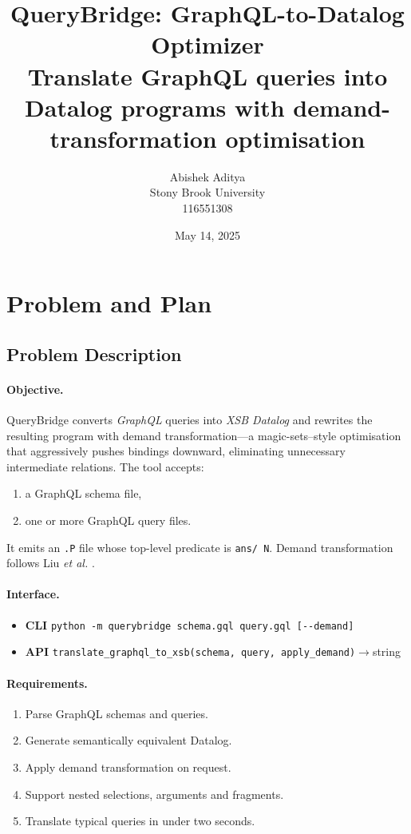 \documentclass[11pt]{article}
\title{\textbf{QueryBridge: GraphQL-to-Datalog Optimizer}\\
\large Translate GraphQL queries into Datalog programs with demand-transformation optimisation}
\author{Abishek Aditya \\ Stony Brook University \\ 116551308}
\date{May 14, 2025}
\begin{document}
\maketitle
\thispagestyle{fancy}

\section{Problem and Plan}
\subsection{Problem Description}
\paragraph{Objective.}
QueryBridge converts \emph{GraphQL} queries into \emph{XSB Datalog} and rewrites the resulting program with demand transformation—a magic-sets–style optimisation that aggressively pushes bindings downward, eliminating unnecessary intermediate relations.  
The tool accepts:
\begin{enumerate}[label=\arabic*.]
  \item a GraphQL schema file,
  \item one or more GraphQL query files.
\end{enumerate}
It emits an \texttt{.P} file whose top-level predicate is \texttt{ans/\,N}.  
Demand transformation follows Liu \emph{et al.} \cite{DemandTransform}.

\paragraph{Interface.}
\begin{itemize}[nosep,leftmargin=1.5em]
  \item \textbf{CLI} \verb|python -m querybridge schema.gql query.gql [--demand]|
  \item \textbf{API} \verb|translate_graphql_to_xsb(schema, query, apply_demand)|$\!\rightarrow$string
\end{itemize}

\paragraph{Requirements.}
\begin{enumerate}[label=\arabic*.]
  \item Parse GraphQL schemas and queries.
  \item Generate semantically equivalent Datalog.
  \item Apply demand transformation on request.
  \item Support nested selections, arguments and fragments.
  \item Translate typical queries in under two seconds.
\end{enumerate}
\end{document}
